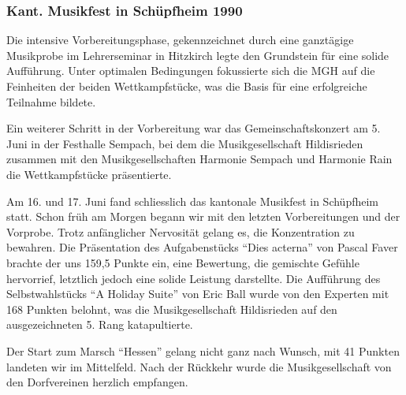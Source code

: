 \begin{history}
    \subsubsection{Kant. Musikfest in Schüpfheim 1990}

    Die intensive Vorbereitungsphase, gekennzeichnet durch eine ganztägige
    Musikprobe im Lehrerseminar in Hitzkirch legte den Grundstein für eine
    solide Aufführung. Unter optimalen Bedingungen fokussierte sich die MGH auf
    die Feinheiten der beiden Wettkampfstücke, was die Basis für eine
    erfolgreiche Teilnahme bildete.

    Ein weiterer Schritt in der Vorbereitung war das Gemeinschaftskonzert am 5.
    Juni in der Festhalle Sempach, bei dem die Musikgesellschaft Hildisrieden
    zusammen mit den Musikgesellschaften Harmonie Sempach und Harmonie Rain die
    Wettkampfstücke präsentierte.

    Am 16. und 17. Juni fand schliesslich das kantonale Musikfest in Schüpfheim
    statt. Schon früh am Morgen begann wir mit den letzten Vorbereitungen und
    der Vorprobe. Trotz anfänglicher Nervosität gelang es, die Konzentration zu
    bewahren. Die Präsentation des Aufgabenstücks \enquote{Dies acterna} von
    Pascal Faver brachte der uns 159,5 Punkte ein, eine Bewertung, die gemischte
    Gefühle hervorrief, letztlich jedoch eine solide Leistung darstellte. Die
    Aufführung des Selbstwahlstücks \enquote{A Holiday Suite} von Eric Ball
    wurde von den Experten mit 168 Punkten belohnt, was die Musikgesellschaft
    Hildisrieden auf den ausgezeichneten 5. Rang katapultierte.

    Der Start zum Marsch \enquote{Hessen} gelang nicht ganz nach Wunsch, mit 41
    Punkten landeten wir im Mittelfeld. Nach der Rückkehr wurde die
    Musikgesellschaft von den Dorfvereinen herzlich empfangen.

\end{history}
\clearpage
